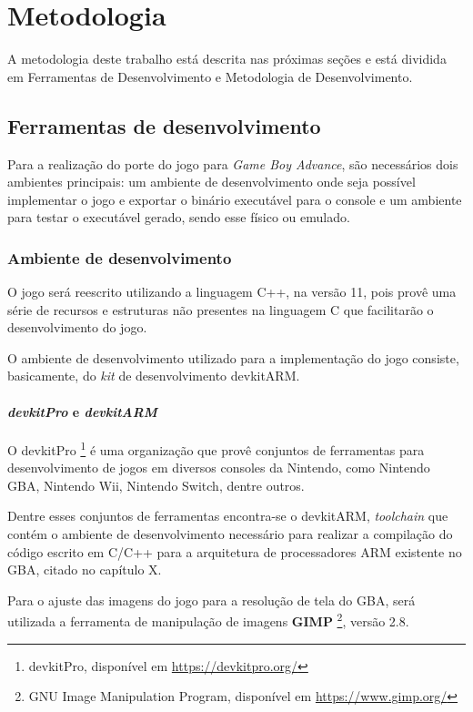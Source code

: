 \chapter[Metodologia]{Metodologia}

A metodologia deste trabalho está descrita nas próximas seções e está dividida em Ferramentas de Desenvolvimento e Metodologia de Desenvolvimento.

\section{Ferramentas de desenvolvimento}

  Para a realização do porte do jogo para \textit{Game Boy Advance}, são necessários dois ambientes principais: um ambiente de desenvolvimento onde seja possível implementar o jogo e exportar o binário executável para o console e um ambiente para testar o executável gerado, sendo esse físico ou emulado.

  \subsection{Ambiente de desenvolvimento}

    O jogo será reescrito utilizando a linguagem C++, na versão 11, pois provê uma série de recursos e estruturas não presentes na linguagem C que facilitarão o desenvolvimento do jogo.

    O ambiente de desenvolvimento utilizado para a implementação do jogo consiste, basicamente, do \textit{kit} de desenvolvimento devkitARM.

    \subsubsection{\textit{devkitPro} e \textit{devkitARM}}

      O devkitPro \footnote{devkitPro, disponível em \url{https://devkitpro.org/}} é uma organização que provê conjuntos de ferramentas para desenvolvimento de jogos em diversos consoles da Nintendo, como Nintendo GBA, Nintendo Wii, Nintendo Switch, dentre outros.

      Dentre esses conjuntos de ferramentas encontra-se o devkitARM, \textit{toolchain} que contém o ambiente de desenvolvimento necessário para realizar a compilação do código escrito em C/C++ para a arquitetura de processadores ARM existente no GBA, citado no capítulo X.

    Para o ajuste das imagens do jogo para a resolução de tela do GBA, será utilizada a ferramenta de manipulação de imagens \textbf{GIMP} \footnote{GNU Image Manipulation Program, disponível em \url{https://www.gimp.org/}}, versão 2.8.

